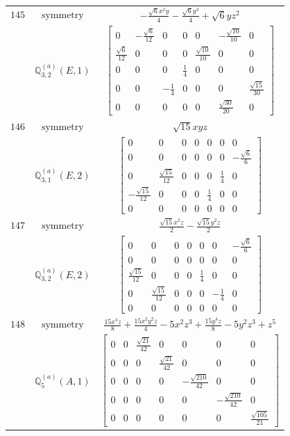 \documentclass[fleqn,8pt,landscape]{jsarticle}
\begin{document}
\begin{longtable}{ccc}
$ 145 $ & $ \text{symmetry} $ & $ - \frac{\sqrt{6} x^{2} y}{4} - \frac{\sqrt{6} y^{3}}{4} + \sqrt{6} y z^{2} $ \\
$  $ & $ \mathbb{Q}_{3,2}^{(a)}(E,1) $ & $ \begin{bmatrix} 0 & - \frac{\sqrt{6}}{12} & 0 & 0 & 0 & - \frac{\sqrt{10}}{10} & 0 \\ \frac{\sqrt{6}}{12} & 0 & 0 & 0 & \frac{\sqrt{10}}{10} & 0 & 0 \\ 0 & 0 & 0 & \frac{1}{4} & 0 & 0 & 0 \\ 0 & 0 & - \frac{1}{4} & 0 & 0 & 0 & \frac{\sqrt{15}}{30} \\ 0 & 0 & 0 & 0 & 0 & \frac{\sqrt{30}}{20} & 0 \end{bmatrix} $ \\ \hline
$ 146 $ & $ \text{symmetry} $ & $ \sqrt{15} x y z $ \\
$  $ & $ \mathbb{Q}_{3,1}^{(a)}(E,2) $ & $ \begin{bmatrix} 0 & 0 & 0 & 0 & 0 & 0 & 0 \\ 0 & 0 & 0 & 0 & 0 & 0 & - \frac{\sqrt{6}}{6} \\ 0 & \frac{\sqrt{15}}{12} & 0 & 0 & 0 & \frac{1}{4} & 0 \\ - \frac{\sqrt{15}}{12} & 0 & 0 & 0 & \frac{1}{4} & 0 & 0 \\ 0 & 0 & 0 & 0 & 0 & 0 & 0 \end{bmatrix} $ \\ \hline
$ 147 $ & $ \text{symmetry} $ & $ \frac{\sqrt{15} x^{2} z}{2} - \frac{\sqrt{15} y^{2} z}{2} $ \\
$  $ & $ \mathbb{Q}_{3,2}^{(a)}(E,2) $ & $ \begin{bmatrix} 0 & 0 & 0 & 0 & 0 & 0 & - \frac{\sqrt{6}}{6} \\ 0 & 0 & 0 & 0 & 0 & 0 & 0 \\ \frac{\sqrt{15}}{12} & 0 & 0 & 0 & \frac{1}{4} & 0 & 0 \\ 0 & \frac{\sqrt{15}}{12} & 0 & 0 & 0 & - \frac{1}{4} & 0 \\ 0 & 0 & 0 & 0 & 0 & 0 & 0 \end{bmatrix} $ \\ \hline
$ 148 $ & $ \text{symmetry} $ & $ \frac{15 x^{4} z}{8} + \frac{15 x^{2} y^{2} z}{4} - 5 x^{2} z^{3} + \frac{15 y^{4} z}{8} - 5 y^{2} z^{3} + z^{5} $ \\
$  $ & $ \mathbb{Q}_{5}^{(a)}(A,1) $ & $ \begin{bmatrix} 0 & 0 & \frac{\sqrt{21}}{42} & 0 & 0 & 0 & 0 \\ 0 & 0 & 0 & \frac{\sqrt{21}}{42} & 0 & 0 & 0 \\ 0 & 0 & 0 & 0 & - \frac{\sqrt{210}}{42} & 0 & 0 \\ 0 & 0 & 0 & 0 & 0 & - \frac{\sqrt{210}}{42} & 0 \\ 0 & 0 & 0 & 0 & 0 & 0 & \frac{\sqrt{105}}{21} \end{bmatrix} $ \\ \hline

\end{longtable}
\end{document}
